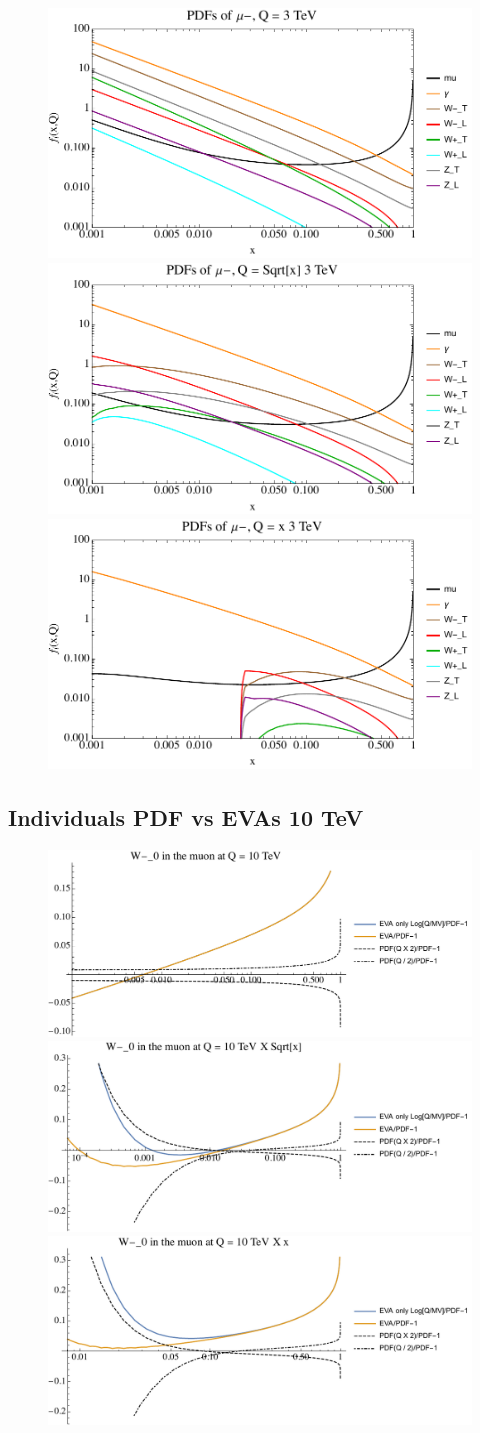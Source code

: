 \documentclass[a4paper,11pt]{article}
\begin{document}
\begin{figure}[ht]
\includegraphics[width=0.4\linewidth]{PlotPDFs/alltogether/3TeV_mu-scaleQ.pdf}
\includegraphics[width=0.4\linewidth]{PlotPDFs/alltogether/3TeV_mu-scaleQsqrtx.pdf}
\includegraphics[width=0.4\linewidth]{PlotPDFs/alltogether/3TeV_mu-scaleQx.pdf}
\end{figure}



\clearpage
\subsection{Individuals PDF vs EVAs 10 TeV}

\begin{figure}[ht]
\includegraphics[width=0.4\linewidth]{PlotPDFs/ratios/10TeV/W-_0_Q.pdf}
\includegraphics[width=0.4\linewidth]{PlotPDFs/ratios/10TeV/W-_0_Qsqrtx.pdf}
\includegraphics[width=0.4\linewidth]{PlotPDFs/ratios/10TeV/W-_0_Qx.pdf}
\end{figure}
\end{document}
